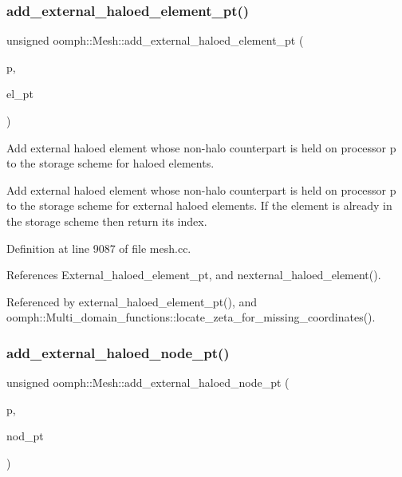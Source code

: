 \mbox{\label{classoomph_1_1Mesh_a85fd3fc85e61062a50cdc56dec197449}} 
\subsubsection{\texorpdfstring{add\+\_\+external\+\_\+haloed\+\_\+element\+\_\+pt()}{add\_external\_haloed\_element\_pt()}}
{\footnotesize\ttfamily unsigned oomph\+::\+Mesh\+::add\+\_\+external\+\_\+haloed\+\_\+element\+\_\+pt (\begin{DoxyParamCaption}\item[{const unsigned \&}]{p,  }\item[{\hyperlink{classoomph_1_1GeneralisedElement}{Generalised\+Element} $\ast$\&}]{el\+\_\+pt }\end{DoxyParamCaption})}



Add external haloed element whose non-\/halo counterpart is held on processor p to the storage scheme for haloed elements. 

Add external haloed element whose non-\/halo counterpart is held on processor p to the storage scheme for external haloed elements. If the element is already in the storage scheme then return its index. 

Definition at line 9087 of file mesh.\+cc.



References External\+\_\+haloed\+\_\+element\+\_\+pt, and nexternal\+\_\+haloed\+\_\+element().



Referenced by external\+\_\+haloed\+\_\+element\+\_\+pt(), and oomph\+::\+Multi\+\_\+domain\+\_\+functions\+::locate\+\_\+zeta\+\_\+for\+\_\+missing\+\_\+coordinates().

\mbox{\label{classoomph_1_1Mesh_a2cc2600eb480287be5afe6bebf430c00}} 
\subsubsection{\texorpdfstring{add\+\_\+external\+\_\+haloed\+\_\+node\+\_\+pt()}{add\_external\_haloed\_node\_pt()}}
{\footnotesize\ttfamily unsigned oomph\+::\+Mesh\+::add\+\_\+external\+\_\+haloed\+\_\+node\+\_\+pt (\begin{DoxyParamCaption}\item[{const unsigned \&}]{p,  }\item[{\hyperlink{classoomph_1_1Node}{Node} $\ast$\&}]{nod\+\_\+pt }\end{DoxyParamCaption})}




